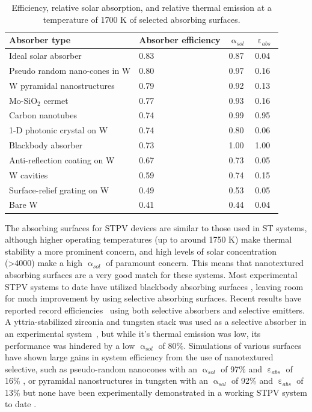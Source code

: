 \documentclass[review]{elsarticle}
\begin{document}
\begin{table}
	\caption{Efficiency, relative solar absorption, and relative thermal emission at a temperature of 1700 K of selected absorbing surfaces.}
	\label{abs_eff_table}
	\begin{center}
		\begin{tabular}{|llll|}
			\hline
			Absorber type & Absorber efficiency & $\upalpha_{sol}$ & $\upepsilon_{abs}$\\
			\hline	
			Ideal solar absorber & 0.83 & 0.87 & 0.04\\
			Pseudo random nano-cones in W & 0.80 & 0.97 & 0.16~\cite{me1}\\
			W pyramidal nanostructures & 0.79 & 0.92 & 0.13~\cite{paper1_ref4}\\
			Mo-SiO$_2$ cermet & 0.77 & 0.93 & 0.16~\cite{cermet6}\\
			Carbon nanotubes & 0.74 & 0.99 & 0.95~\cite{MIT_paper,nnnNature}\\
			1-D photonic crystal on W & 0.74 & 0.80 & 0.06~\cite{SKY_JPE_2015}\\
			Blackbody absorber & 0.73 & 1.00 & 1.00\\
			Anti-reflection coating on W & 0.67 & 0.73 & 0.05~\cite{SKY_JPE_2015}\\
			W cavities & 0.59 & 0.74 & 0.15~\cite{exp_russia}\\
			Surface-relief grating on W & 0.49 & 0.53 & 0.05~\cite{paper1_ref6}\\
			Bare W & 0.41 & 0.44 & 0.04~\cite{palik}\\
			\hline
		\end{tabular}
	\end{center}
\end{table}

The absorbing surfaces for STPV devices are similar to those used in ST systems, although higher operating temperatures (up to around 1750 K) 
make thermal stability a more prominent concern, and high levels of solar concentration (\textgreater4000) make a high $\upalpha_{sol}$ of 
paramount concern.  This means that nanotextured absorbing surfaces are a very good match for these systems.  Most experimental STPV systems 
to date have utilized blackbody absorbing surfaces \cite{exp_tokyo,exp_madrid,exp_russia,MIT_paper}, leaving room for much improvement by using 
selective absorbing surfaces. Recent results have reported record efficiencies~\cite{g11,SKY_JPE_2015} using both 
selective absorbers and selective emitters. A yttria-stabilized zirconia and tungsten stack was used as a selective absorber in an experimental system~\cite{SKY_JPE_2015}, 
but while it's thermal emission was low, its performance was hindered by a low $\upalpha_{sol}$ of 80\%.  Simulations of various surfaces 
have shown large gains in system efficiency from the use of nanotextured selective, such as pseudo-random 
nanocones with an $\upalpha_{sol}$ of 97\% and $\upepsilon_{abs}$ of 16\% \cite{me1}, or pyramidal nanostructures in tungsten 
with an $\upalpha_{sol}$ of 92\% and $\upepsilon_{abs}$ of 13\% \cite{paper1_ref4} but none have been experimentally 
demonstrated in a working STPV system to date \cite{paper1_ref5,paper1_ref6}.
\end{document}
